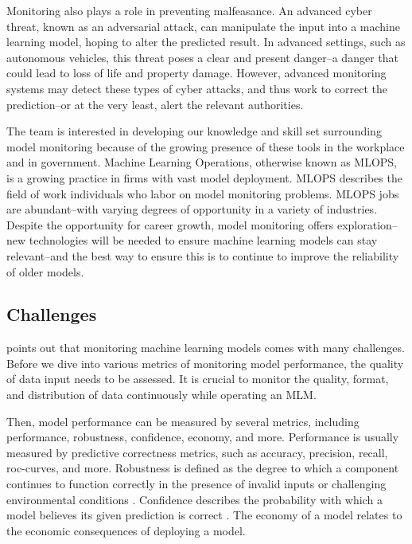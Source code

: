 \documentclass[
	letterpaper, %
	12pt, %
]{CSUniSchoolLabReport}
\begin{document}
Monitoring also plays a role in preventing malfeasance. An advanced cyber threat, known as an adversarial attack, can manipulate the input into a machine learning model, hoping to alter the predicted result. In advanced settings, such as autonomous vehicles, this threat poses a clear and present danger–a danger that could lead to loss of life and property damage. However, advanced monitoring systems may detect these types of cyber attacks, and thus work to correct the prediction–or at the very least, alert the relevant authorities. \par

The team is interested in developing our knowledge and skill set surrounding model monitoring because of the growing presence of these tools in the workplace and in government. Machine Learning Operations, otherwise known as MLOPS, is a growing practice in firms with vast model deployment. MLOPS describes the field of work individuals who labor on model monitoring problems. MLOPS jobs are abundant–with varying degrees of opportunity in a variety of industries. Despite the opportunity for career growth, model monitoring offers exploration–new technologies will be needed to ensure machine learning models can stay relevant–and the best way to ensure this is to continue to improve the reliability of older models.

\subsection{Challenges}
\autocite{SCHRODER2022} points out that monitoring machine learning models comes with many challenges. Before we dive into various metrics of monitoring model performance, the quality of data input needs to be assessed. It is crucial to monitor the quality, format, and distribution of data continuously while operating an MLM.

Then, model performance can be measured by several metrics, including performance, robustness, confidence, economy, and more. Performance is usually measured by predictive correctness metrics, such as accuracy, precision, recall, roc-curves, and more. Robustness is defined as the degree to which a component continues to function correctly in the presence of invalid inputs or challenging environmental conditions \autocite{ieee1983ieee}. Confidence describes the probability with which a model believes its given prediction is correct \autocite{machin2013statistics}. The economy of a model relates to the economic consequences of deploying a model. 
\end{document}
